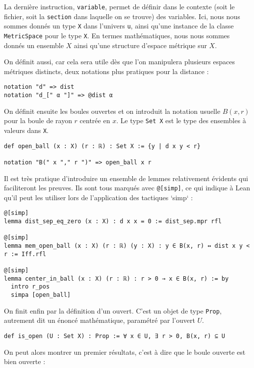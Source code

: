 \documentclass[a4paper, 12pt]{article}
\newcommand{\lean}[1]{\texttt{#1}}
\begin{document}
La dernière instruction, \lean{variable}, permet de définir dans le contexte (soit le fichier, soit la \lean{section} dans laquelle on se trouve) des variables. Ici, nous nous sommes donnés un type \lean{X} dans l'univers \lean{u}, ainsi qu'une instance de la classe \lean{MetricSpace} pour le type \lean{X}. En termes mathématiques, nous nous sommes donnés un ensemble $X$ ainsi qu'une structure d'espace métrique sur $X$.

On définit aussi, car cela sera utile dès que l'on manipulera plusieurs espaces métriques distincts, deux notations plus pratiques pour la distance :

\begin{verbatim}
notation "d" => dist
notation "d_[" α "]" => @dist α
\end{verbatim}

On définit ensuite les boules ouvertes et on introduit la notation usuelle $B(x, r)$ pour la boule de rayon $r$ centrée en $x$. Le type \lean{Set X} est le type des ensembles à valeurs dans \lean{X}.

\begin{verbatim}
def open_ball (x : X) (r : ℝ) : Set X := {y | d x y < r}

notation "B(" x "," r ")" => open_ball x r
\end{verbatim}

Il est très pratique d'introduire un ensemble de lemmes relativement évidents qui faciliteront les preuves. Ils sont tous marqués avec \lean{@[simp]}, ce qui indique à Lean qu'il peut les utiliser lors de l'application des tactiques `simp` :

\begin{verbatim}
@[simp]
lemma dist_sep_eq_zero (x : X) : d x x = 0 := dist_sep.mpr rfl

@[simp]
lemma mem_open_ball (x : X) (r : ℝ) (y : X) : y ∈ B(x, r) ↔ dist x y < r := Iff.rfl

@[simp]
lemma center_in_ball (x : X) (r : ℝ) : r > 0 → x ∈ B(x, r) := by
  intro r_pos
  simpa [open_ball]
\end{verbatim}

On finit enfin par la définition d'un ouvert. C'est un objet de type \lean{Prop}, autrement dit un énoncé mathématique, paramétré par l'ouvert $U$.

\begin{verbatim}
def is_open (U : Set X) : Prop := ∀ x ∈ U, ∃ r > 0, B(x, r) ⊆ U
\end{verbatim}

On peut alors montrer un premier résultats, c'est à dire que le boule ouverte est bien ouverte :
\end{document}
